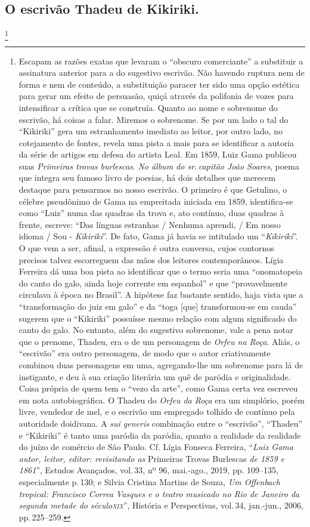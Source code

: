 \subsection{O escrivão Thadeu de Kikiriki.}\footnote{ Escapam as razões exatas que
  levaram o ``obscuro comerciante'' a substituir a assinatura anterior
  para a do sugestivo escrivão. Não havendo ruptura nem de forma e nem
  de conteúdo, a substituição paracer ter sido uma opção estética para
  gerar um efeito de persuasão, quiçá através da polifonia de vozes para
  intensificar a crítica que se construía. Quanto ao nome e sobrenome do
  escrivão, há coisas a falar. Miremos o sobrenome. Se por um lado o tal
  do ``Kikiriki'' gera um estranhamento imediato ao leitor, por outro
  lado, no cotejamento de fontes, revela uma pista a mais para se
  identificar a autoria da série de artigos em defesa do artista Leal.
  Em 1859, Luiz Gama publicou suas \emph{Primeiras trovas burlescas}.
  \emph{No álbum do sr.\,capitão João Soares}, poema que integra seu
  famoso livro de poesias, há dois detalhes que merecem destaque para
  pensarmos no nosso escrivão. O primeiro é que Getulino, o célebre
  pseudônimo de Gama na empreitada iniciada em 1859, identifica-se como
  ``Luiz'' numa das quadras da trova e, ato contínuo, duas quadras à
  frente, escreve: ``Das línguas estranhas / Nenhuma aprendi, / Em nosso
  idioma / Sou - \emph{Kikiriki}''. De fato, Gama já havia se intitulado
  um ``\emph{Kikiriki}''. O que vem a ser, afinal, a expressão é outra
  conversa, cujos contornos precisos talvez escorreguem das mãos dos
  leitores contemporâneos. Lígia Ferreira dá uma boa pista ao
  identificar que o termo seria uma ``onomatopeia do canto do galo, ainda
  hoje corrente em espanhol'' e que ``provavelmente circulava à época no
  Brasil''. A hipótese faz bastante sentido, haja vista que a
  ``transformação do juiz em galo'' e da ``toga {[}que{]} transformou-se em
  cauda'' sugerem que o ``Kikiriki'' possuísse mesmo relação com algum
  significado do canto do galo. No entanto, além do sugestivo sobrenome,
  vale a pena notar que o prenome, Thadeu, era o de um personagem de
  \emph{Orfeu na Roça}. Aliás, o ``escrivão'' era outro personagem, de
  modo que o autor criativamente combinou duas personagens em uma,
  agregando-lhe um sobrenome para lá de instigante, e deu à sua criação
  literária um quê de paródia e originalidade. Coisa própria de quem tem
  o ``vezo da arte'', como Gama certa vez escreveu em nota autobiográfica.
  O Thadeu do \emph{Orfeu da Roça} era um simplório, porém livre,
  vendedor de mel, e o escrivão um empregado tolhido de contínuo pela
  autoridade doidivana. A \emph{sui generis} combinação entre o
  ``escrivão'', ``Thadeu'' e ``Kikiriki'' é tanto uma paródia da paródia,
  quanto a realidade da realidade do juízo de comércio de São Paulo. Cf.
  Lígia Fonseca Ferreira, ``\emph{Luiz Gama autor, leitor, editor:
  revisitando as} Primeiras Trovas Burlescas \emph{de 1859 e 1861}'',
  Estudos Avançados, vol.\,33, nº 96, mai.-ago., 2019, pp. 109--135,
  especialmente p.\,130; e Silvia Cristina Martins de Souza, \emph{Um
  Offenbach tropical: Francisco Correa Vasques e o teatro musicado no
  Rio de Janeiro da segunda metade do século\textsc{xix}}'', História e
  Perspectivas, vol.\,34, jan.-jun., 2006, pp.\,225--259.}

